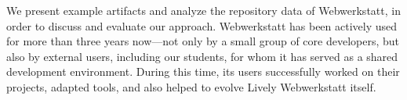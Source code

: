 We present example artifacts and analyze the repository data of Webwerkstatt, in order to discuss and evaluate our approach. Webwerkstatt has been actively used for more than three years now---not only by a small group of core developers, but also by external users, including our students, for whom it has served as a  shared development environment. During this time, its users successfully worked on their projects, adapted tools, and also helped to evolve Lively Webwerkstatt itself. 










